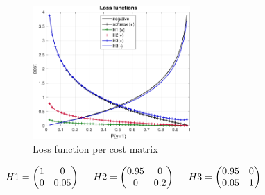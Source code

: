 \documentclass[a4paper]{article}
\begin{document}
            \begin{center}
            \begin{minipage}{.6\textwidth}
            \begin{figure}[H]
                \centering
                \includegraphics[width=6cm]{exp1/losses}
                \caption{Loss function per cost matrix\label{unbLoss}}
            \end{figure}
            \end{minipage}
            \begin{minipage}{.3\textwidth}
            $
            H1 = \begin{pmatrix} 1 & 0 \\ 0 & 0.05 \end{pmatrix}\\ %
            \phantom{abc}\\
            H2 = \begin{pmatrix} 0.95 & 0 \\ 0 & 0.2 \end{pmatrix}\\ %
            \phantom{abc}\\
            H3 = \begin{pmatrix} 0.95 & 0 \\ 0.05 & 1 \end{pmatrix}\\ %
            $
            \end{minipage}
            \end{center}
\end{document}
